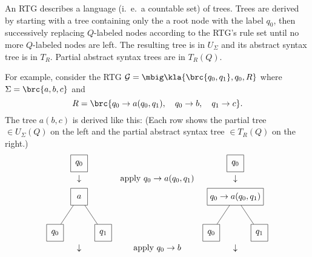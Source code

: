 An RTG describes a language (i.~e.~a countable set) of trees. Trees are derived
by starting with a tree containing only the a root node with the label $q_0$,
then successively replacing $Q$-labeled nodes according to the RTG's rule set
until no more $Q$-labeled nodes are left. The resulting tree is in $U_\Sigma$
and its abstract syntax tree is in $T_R$. Partial abstract syntax trees are in $T_R(Q)$.

For example, consider the RTG $\ug = \mbig\kla{\brc{q_0,q_1},q_0,R}$ where
$\Sigma=\brc{a,b,c}$ and
\[
 R = \brc{ q_0 \to a(q_0,q_1), \quad q_0 \to b, \quad q_1 \to c }.
\]
The tree $a(b,c)$ is derived like this: (Each row shows the partial tree $\in
U_\Sigma(Q)$ on the left and the partial abstract syntax tree $\in T_R(Q)$ on the
right.)
\[\begin{matrix}
 \begin{tikzpicture}[every node/.style={rectangle,draw,minimum size=2em},baseline=(current bounding box.center)]
  \node (n) at (0,0) { $q_0$ };
 \end{tikzpicture}
 &&
 \begin{tikzpicture}[every node/.style={rectangle,draw,minimum size=2em},baseline=(current bounding box.center)]
  \node (n) at (0,0) { $q_0$ };
 \end{tikzpicture}
 \\\\[-1em]
 \downarrow & \text{apply } q_0\to a(q_0,q_1) & \downarrow \\[0.5em]
 \begin{tikzpicture}[every node/.style={rectangle,draw,minimum size=2em},baseline=(current bounding box.center)]
  \node (n) at (0,0) { $a$ };
  \node (n1) at (-1,-1.5) { $q_0$ } edge (n);
  \node (n2) at (+1,-1.5) { $q_1$ } edge (n);
 \end{tikzpicture}
 &\hspace*{4em}&
 \begin{tikzpicture}[every node/.style={rectangle,draw,minimum size=2em},baseline=(current bounding box.center)]
  \node (n) at (0,0) { $q_0 \to a(q_0,q_1)$ };
  \node (n1) at (-1,-1.5) { $q_0$ } edge (n);
  \node (n2) at (+1,-1.5) { $q_1$ } edge (n);
 \end{tikzpicture}
 \\\\[-1em]
 \downarrow & \text{apply } q_0\to b & \downarrow \\[0.5em]
 \begin{tikzpicture}[every node/.style={rectangle,draw,minimum size=2em},baseline=(current bounding box.center)]

\end{tikzpicture}
\end{matrix}\]

